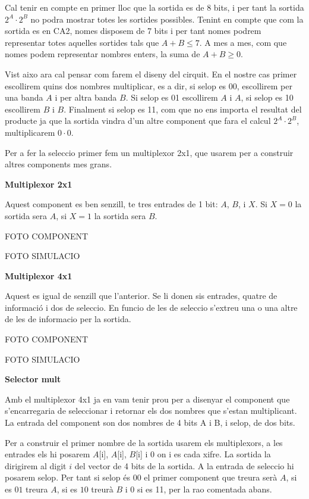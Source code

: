 \documentclass[12pt, a4papre]{article}
\begin{document}
	Cal tenir en compte en primer lloc que la sortida es de 8 bits, i per tant la sortida $2^A\cdot2^B$ no podra mostrar totes les sortides possibles. Tenint en compte que com la sortida es en CA2, nomes disposem de 7 bits i per tant nomes podrem representar totes aquelles sortides tals que $A+B \leqslant 7$. A mes a mes, com que nomes podem representar nombres enters, la suma de $A+B \geqslant 0$. 
	
	Vist aixo ara cal pensar com farem el diseny del cirquit. En el nostre cas primer escollirem quins dos nombres multiplicar, es a dir, si selop es 00, escollirem per una banda $A$ i per altra banda $B$. Si selop es 01 escollirem $A$ i $A$, si selop es 10 escollirem $B$ i $B$. Finalment si selop es 11, com que no ens importa el resultat del producte ja que la sortida vindra d'un altre component que fara el calcul $2^A\cdot2^B$, multiplicarem $0\cdot 0$.
	
	Per a fer la seleccio primer fem un multiplexor 2x1, que usarem per a construir altres components mes grans.
	
	\textbf{\large{Multiplexor 2x1}}
	
	Aquest component es ben senzill, te tres entrades de 1 bit: $A$, $B$, i $X$. Si $X=0$ la sortida sera $A$, si $X=1$ la sortida sera $B$.
	
	\begin{center}
		FOTO COMPONENT
		
		FOTO SIMULACIO
	\end{center}
	
	\textbf{\large{Multiplexor 4x1}}
	
	Aquest es igual de senzill que l'anterior. Se li donen sis entrades, quatre de informació i dos de seleccio. En funcio de les de seleccio s'extreu una  o una altre de les de informacio per la sortida.
	
	\begin{center}
		FOTO COMPONENT
		
		FOTO SIMULACIO
	\end{center}
	
	\textbf{\large{Selector mult}}
	
	Amb el multiplexor 4x1 ja en vam tenir prou per a disenyar el component que s'encarregaria de seleccionar i retornar els dos nombres que s'estan multiplicant. La entrada del component son dos nombres de 4 bits A i B, i selop, de dos bits. 
	
	Per a construir el primer nombre de la sortida usarem els multiplexors, a les entrades els hi posarem $A$[i], $A$[i], $B$[i] i 0 on i es cada xifre. La sortida la dirigirem al digit $i$ del vector de 4 bits de la sortida. A la entrada de seleccio hi posarem selop. Per tant si selop és $00$ el primer component que treura serà $A$, si es $01$ treura $A$, si es $10$ treurà $B$ i 0 si es 11, per la rao comentada abans.
	
\end{document}
